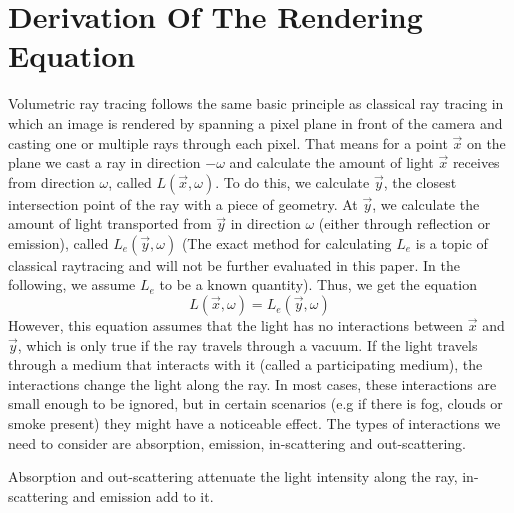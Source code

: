 \section{Derivation Of The Rendering Equation}
Volumetric ray tracing follows the same basic principle as classical ray tracing in which an image is rendered by spanning a pixel plane in front of the camera and casting one or multiple rays through each pixel.
That means for a point $\vec{x}$ on the plane we cast a ray in direction $-\omega$ and calculate the amount of light $\vec{x}$ receives from direction $\omega$, called $L(\vec{x},\omega )$\cite{10.5555/94788}.
To do this, we calculate $\vec{y}$, the closest intersection point of the ray with a piece of geometry. At $\vec{y}$, we calculate the amount of light transported from $\vec{y}$ in direction $\omega$ (either through reflection or emission), called $L_e(\vec{y},\omega )$ (The exact method for calculating $L_e$ is a topic of classical raytracing\cite{10.5555/94788} and will not be further evaluated in this paper. In the following, we assume $L_e$ to be a known quantity).
Thus, we get the equation 
\begin{equation}\label{eq:no_attenuation}
L(\vec{x},\omega ) = L_e(\vec{y}, \omega )
\end{equation}
However, this equation assumes that the light has no interactions between $\vec{x}$ and $\vec{y}$, which is only true if the ray travels through a vacuum. If the light travels through a medium that interacts with it (called a participating medium), the interactions change the light along the ray\cite{10.5555/275458.275468}. In most cases, these interactions are small enough to be ignored, but in certain scenarios (e.g if there is fog, clouds or smoke present) they might have a noticeable effect. The types of interactions we need to consider are absorption, emission, in-scattering and out-scattering\cite{468400}.

Absorption and out-scattering attenuate the light intensity along the ray, in-scattering and emission add to it.
